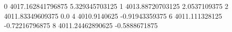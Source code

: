 0 4017.162841796875 5.329345703125
1 4013.88720703125 2.0537109375
2 4011.83349609375 0.0
4 4010.9140625 -0.91943359375
6 4011.111328125 -0.72216796875
8 4011.24462890625 -0.5888671875
